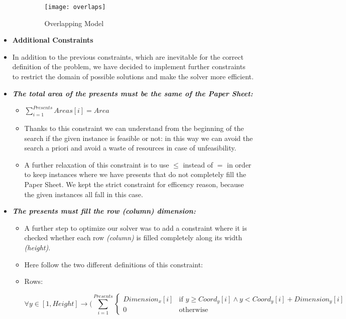 \begin{itemize}
\begin{itemize}
		\begin{figure}[ht]
			\centering
			\texttt{[image: overlaps]}
			\caption{Overlapping Model}
			\label{fig:overlaps}
		\end{figure}
	\end{itemize}

	\newpage
	\item[] \textbf{Additional Constraints}
	\item[] In addition to the previous constraints, which are inevitable for the correct definition of the problem, we have decided to implement further constraints to restrict the domain of possible solutions and make the solver more efficient.
	\item \textbf{\textit{The total area of the presents must be the same of the Paper Sheet:}}
	\begin{itemize}
		\item[] $\sum_{i = 1}^{Presents}{Areas[i]} = Area$
		\item[] Thanks to this constraint we can understand from the beginning of the search if the given instance is feasible or not: in this way we can avoid the search a priori and avoid a waste of resources in case of unfeasibility.	
		\item[] A further relaxation of this constraint is to use $\leq$ instead of $=$ in order 
		to keep instances where we have presents that do not completely fill the Paper Sheet.  
		We kept the strict constraint for efficency reason, because the given instances all fall
		in this case.
	\end{itemize}
	\item \textbf{\textit{The presents must fill the row (column) dimension:}}
	\begin{itemize}
		\item[] A further step to optimize our solver was to add a constraint where it is checked whether each row \textit{(column)} is filled completely along its width \textit{(height)}.
		\item[] Here follow the two different definitions of this constraint:
		\item[] Rows:
		\begin{adjustwidth}{-3.3cm}{}\begin{equation*}
			\forall y \in [1, Height] \rightarrow (\sum_{i = 1}^{Presents}{
				\begin{cases}
					Dimension_x[i] & \text{if } y \geq Coord_y[i] \wedge y < Coord_y[i] + Dimension_y[i] \\
					0 & \text{otherwise}

\end{cases}}
\end{equation*}
\end{adjustwidth}
\end{itemize}
\end{itemize}
